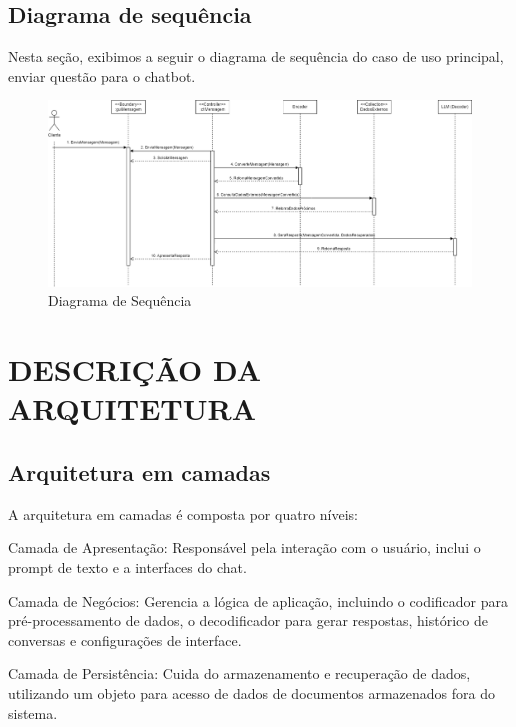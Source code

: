 \documentclass[
	12pt,				%
	openright,			%
	oneside,			    %
	a4paper,				%
	english,			%
	french,			%
	spanish,			%
	brazil			%
	]{abntex2}
\begin{document}
\clearpage
\section{Diagrama de sequência}
Nesta seção, exibimos a seguir o diagrama de sequência do caso de uso principal, enviar questão para o chatbot.

\begin{figure}[h]
    \centering
    \includegraphics[width=1\linewidth]{Diagrama de Sequencia.drawio.png}
    \caption{Diagrama de Sequência}
    \label{fig:enter-label}
\end{figure}

\chapter{DESCRIÇÃO DA ARQUITETURA}

\section{Arquitetura em camadas}
A arquitetura em camadas é composta por quatro níveis:

Camada de Apresentação: Responsável pela interação com o usuário, inclui o prompt de texto e a interfaces do chat.

Camada de Negócios: Gerencia a lógica de aplicação, incluindo o codificador para pré-processamento de dados, o decodificador para gerar respostas, histórico de conversas e configurações de interface.

Camada de Persistência: Cuida do armazenamento e recuperação de dados, utilizando um objeto para acesso de dados de documentos armazenados fora do sistema.
\end{document}
